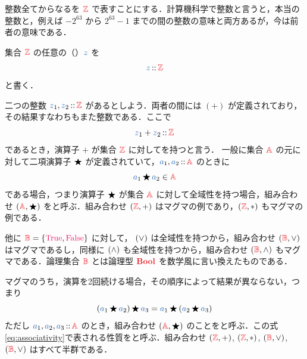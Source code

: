 \documentclass[a5paper,twoside,fleqn,draft]{jsbook}
\begin{document}
整数全てからなるを $\hSet{Z}$ で表すことにする．計算機科学で整数と言うと，本当の整数と，例えば $-2^{63}$ から $2^{63}-1$ までの間の整数の意味と両方あるが，今は前者の意味である．

集合 $\hSet{Z}$ の任意の（）$\hVar{z}$ を
\begin{equation}
  \hVar{z}
  \hIsTypeOf\hSet{Z}
\end{equation}
と書く．

二つの整数 $\hVar{z}_1,\hVar{z}_2\hIsTypeOf\hSet{Z}$ があるとしよう．両者の間には $(+)$ が定義されており，その結果すなわちもまた整数である．ここで
\begin{equation}
  \hVar{z}_1+\hVar{z}_2
  \hIsTypeOf\hSet{Z}
\end{equation}
であるとき，演算子 $+$ が集合 $\hSet{Z}$ に対してを持つと言う．
一般に集合 $\hSet{A}$ の元に対して二項演算子 $\operatorname{\bigstar}$ が定義されていて，$\hVar{a}_1,\hVar{a}_2\hIsTypeOf\hSet{A}$ のときに
\begin{equation}
  \label{eq:totality}
  \hVar{a}_1\hAnyBinOp \hVar{a}_2
  \in\hSet{A}
\end{equation}
である場合，つまり演算子 $\operatorname{\bigstar}$ が集合 $\hSet{A}$ に対して全域性を持つ場合，組み合わせ $\hSingleTuppleWith{\hSet{A},\hAnyBinOp}$ をと呼ぶ．組み合わせ $\hSingleTuppleWith{\hSet{Z},+}$ はマグマの例であり，$\hSingleTuppleWith{\hSet{Z},*}$ もマグマの例である．

他に $\hSet{B}=\{\hTrue,\hFalse\}$ に対して， $(\operatorname{\vee})$ は全域性を持つから，組み合わせ $\hSingleTuppleWith{\hSet{B},\hLogicalOr}$ はマグマであるし，同様に $(\operatorname{\wedge})$ も全域性を持つから，組み合わせ $\hSingleTuppleWith{\hSet{B},\hLogicalAnd}$ もマグマである．論理集合 $\hSet{B}$ とは論理型 $\hBool$ を数学風に言い換えたものである．

マグマのうち，演算を2回続ける場合，その順序によって結果が異ならない，つまり
\begin{equation}
  \label{eq:associativity}
  \left(\hVar{a}_1\hAnyBinOp \hVar{a}_2\right)\hAnyBinOp \hVar{a}_3
  =\hVar{a}_1\hAnyBinOp\left(\hVar{a}_2\hAnyBinOp{\hVar{a}_3}\right)
\end{equation}
ただし $\hVar{a}_1,\hVar{a}_2,\hVar{a}_3\hIsTypeOf\hSet{A}$ のとき，組み合わせ $\hSingleTuppleWith{\hSet{A},\hAnyBinOp}$ のことをと呼ぶ．この式\eqref{eq:associativity}で表される性質をと呼ぶ．組み合わせ $\hSingleTuppleWith{\hSet{Z},+}$, $\hSingleTuppleWith{\hSet{Z},*}$, $\hSingleTuppleWith{\hSet{B},\hLogicalOr}$, $\hSingleTuppleWith{\hSet{B},\hLogicalOr}$ はすべて半群である．
\end{document}
